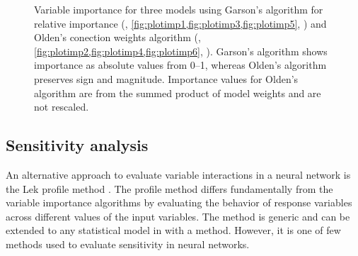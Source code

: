 \documentclass[article,shortnames]{jss}
\begin{document}
\begin{figure}[!h]
\caption{Variable importance for three models using Garson's algorithm for relative importance (, \cref{fig:plotimp1,fig:plotimp3,fig:plotimp5}, \citealt{Garson91,Goh95}) and Olden's conection weights algorithm (, \cref{fig:plotimp2,fig:plotimp4,fig:plotimp6}, \citealt{Olden04}).  Garson's algorithm shows importance as absolute values from 0--1, whereas Olden's algorithm preserves sign and magnitude.  Importance values for Olden's algorithm are from the summed product of model weights and are not rescaled.}
\label{fig:plotimp}
\end{figure}

\subsection{Sensitivity analysis}

An alternative approach to evaluate variable interactions in a neural network is the Lek profile method \citep{Lek96,Gevrey03}. The profile method differs fundamentally from the variable importance algorithms by evaluating the behavior of response variables across different values of the input variables. The method is generic and can be extended to any statistical model in  with a  method. However, it is one of few methods used to evaluate sensitivity in neural networks.  
\end{document}
